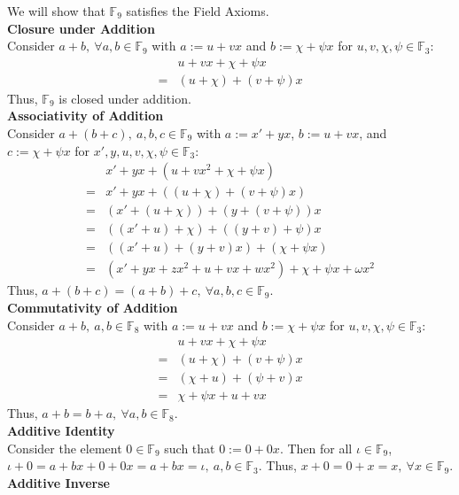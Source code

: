 \documentclass[11pt]{article}
\begin{document}
\begin{flushleft}
We will show that $\mathbb{F}_9$ satisfies the Field Axioms. \\
\bigskip
\textbf{Closure under Addition} \\
Consider $a + b, \ \forall a,b \in \mathbb{F}_9$ with $a := u + vx$ and $b :=\chi + \psi x$ for $u,v, \chi, \psi\in \mathbb{F}_3$:
\begin{align*}
& u + vx + \chi + \psi x \\
= & (u + \chi) + (v + \psi) x
\end{align*}
Thus, $\mathbb{F}_9$ is closed under addition. \\
\bigskip
\textbf{Associativity of Addition} \\
Consider $a + (b + c), \ a,b,c \in \mathbb{F}_9$ with $a := x' + yx$, $b := u + vx$, and $c :=\chi + \psi x$ for $x',y,u,v, \chi, \psi \in \mathbb{F}_3$:
\begin{align*}
& x' + yx + (u + vx^2 + \chi + \psi x ) \\
= & x' + yx + ((u+ \chi) + (v+ \psi)x) \\
= & (x' + (u + \chi)) + (y + (v + \psi))x \\
= & ((x' + u) + \chi) + ((y + v) + \psi)x \\
= & ((x' + u) + (y + v)x) + (\chi + \psi x) \\
= & (x' + yx + zx^2 + u + vx + wx^2) + \chi + \psi x + \omega x^2
\end{align*}
Thus, $a + (b + c) = (a + b) + c, \ \forall a,b,c \in \mathbb{F}_9$. \\ 
\bigskip
\textbf{Commutativity of Addition} \\
Consider $a + b, \ a,b \in \mathbb{F}_8$ with $a := u + vx$ and $b := \chi + \psi x$ for $u,v,\chi,\psi \in \mathbb{F}_3$:
\begin{align*}
& u + vx + \chi + \psi x \\
= & (u + \chi) + (v + \psi)x \\
= & (\chi + u) + (\psi + v)x \\
= & \chi + \psi x + u + vx
\end{align*}
Thus, $a + b = b + a, \ \forall a,b \in \mathbb{F}_8$.
\\
\bigskip
\textbf{Additive Identity} \\
Consider the element $0 \in \mathbb{F}_9$ such that $0 := 0 + 0x$. Then for all $\iota \in \mathbb{F}_9$, $\iota + 0 = a + bx + 0 + 0x = a + bx = \iota, \ a,b \in  \mathbb{F}_3$. Thus, $x + 0 = 0 + x = x, \ \forall x \in \mathbb{F}_9$. \\
\bigskip
\textbf{Additive Inverse} \\

\end{flushleft}
\end{document}
